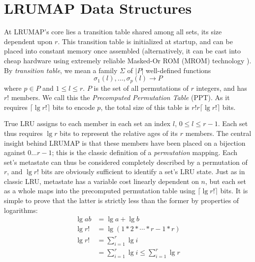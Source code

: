 \documentclass[10pt]{sigplanconf}
\begin{document}
\section{LRUMAP Data Structures}
At LRUMAP's core lies a transition table shared among all sets, its size
dependent upon $r$. This transition table is initialized at startup, and can be
placed into constant memory once assembled (alternatively, it can be cast into
cheap hardware using extremely reliable Masked-Or ROM (MROM)
technology \citep{ice}). By \textit{transition table}, we mean a family $\Sigma$ of $|P|$
well-defined functions \begin{equation*}
\sigma_{1}(l),\dotsc,\sigma_{p}(l)\longrightarrow{P}
\end{equation*} where $p\in{P}$ and $1\le{l}\le{r}$. $P$ is the set of all
permutations of $r$ integers, and has $r!$ members. We call this the \textit{Precomputed
Permutation Table} (PPT). As it requires $\lceil\lg{r!}\rceil$
bits to encode $p$, the total size of this table is $r!r\lceil\lg{r!}\rceil$ bits.

True LRU assigns to each member in each set an index $l$, $0\le{l}\le{r-1}$.
Each set thus requires $\lg{r}$ bits to represent the relative ages of its $r$
members. The central insight behind LRUMAP is that these members have been
placed on a bijection against $0\dotsc{r-1}$; this is the classic definition of
a \textit{permutation} mapping. Each set's metastate can thus be considered
completely described by a permutation of $r$, and $\lg{r!}$ bits are obviously
sufficient to identify a set's LRU state. Just as in classic LRU, metastate has
a variable cost linearly dependent on $n$, but each set as a whole maps into
the precomputed permutation table using $\lceil\lg{r!}\rceil$ bits. It is
simple to prove that the latter is strictly less than the former by properties
of logarithms:
\begin{align*}
\lg{ab} &= \lg{a} + \lg{b} \\
\lg{r!} &= \lg{(1*2*\dotsb*r-1*r)} \\
\lg{r!} &= \sum_{i=1}^{r}{\lg{i}} \\
&= \sum_{i=1}^{r}{\lg{i}} \le \sum_{i=1}^{r}{\lg{r}}
\end{align*}
\end{document}

